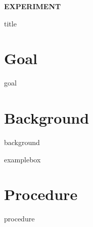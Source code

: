 \documentclass[cover.tex]{subfiles}
\newcommand\chapterlabel{LAB-titration-curve}
\begin{document}
 \begin{refsection}


\hfill\vspace{0.2cm}\begin{center}{\large \bfseries EXPERIMENT \par\Huge
 {title}
 \\[5pt] \par}\vspace{0.2cm}\end{center}\par\noindent
 
 
\section*{Goal}
 {goal}
 
\section*{Background}
 {background}


{examplebox}
\printbibliography[heading=subbibliography]
\section*{Procedure}
{procedure}






\end{refsection}
\end{document}
